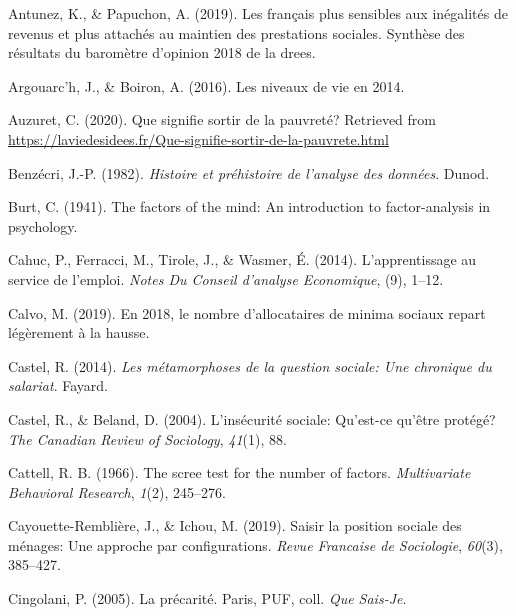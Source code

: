 \documentclass[12pt,a4paper]{reedthesis}
\newenvironment{CSLReferences}%
  {}%
  {\par}
\begin{document}
\hypertarget{refs}{}
\begin{CSLReferences}{1}{0}
\leavevmode\hypertarget{ref-antunez2019franccais}{}%
Antunez, K., \& Papuchon, A. (2019). Les fran{ç}ais plus sensibles aux in{é}galit{é}s de revenus et plus attach{é}s au maintien des prestations sociales. Synth{è}se des r{é}sultats du barom{è}tre d'opinion 2018 de la drees.

\leavevmode\hypertarget{ref-argouarc2016niveaux}{}%
Argouarc'h, J., \& Boiron, A. (2016). Les niveaux de vie en 2014.

\leavevmode\hypertarget{ref-auzuret2020signifie}{}%
Auzuret, C. (2020). Que signifie sortir de la pauvret{é}? Retrieved from \url{https://laviedesidees.fr/Que-signifie-sortir-de-la-pauvrete.html}

\leavevmode\hypertarget{ref-benzecri1982histoire}{}%
Benzécri, J.-P. (1982). \emph{Histoire et pr{é}histoire de l'analyse des donn{é}es}. Dunod.

\leavevmode\hypertarget{ref-burt1941factors}{}%
Burt, C. (1941). The factors of the mind: An introduction to factor-analysis in psychology.

\leavevmode\hypertarget{ref-cahuc2014apprentissage}{}%
Cahuc, P., Ferracci, M., Tirole, J., \& Wasmer, É. (2014). L'apprentissage au service de l'emploi. \emph{Notes Du Conseil d'analyse Economique}, (9), 1--12.

\leavevmode\hypertarget{ref-calvo20192018}{}%
Calvo, M. (2019). En 2018, le nombre d'allocataires de minima sociaux repart l{é}g{è}rement {à} la hausse.

\leavevmode\hypertarget{ref-castel2014metamorphoses}{}%
Castel, R. (2014). \emph{Les m{é}tamorphoses de la question sociale: Une chronique du salariat}. Fayard.

\leavevmode\hypertarget{ref-castel2004insecurite}{}%
Castel, R., \& Beland, D. (2004). L'ins{é}curit{é} sociale: Qu'est-ce qu'{ê}tre prot{é}g{é}? \emph{The Canadian Review of Sociology}, \emph{41}(1), 88.

\leavevmode\hypertarget{ref-cattell1966scree}{}%
Cattell, R. B. (1966). The scree test for the number of factors. \emph{Multivariate Behavioral Research}, \emph{1}(2), 245--276.

\leavevmode\hypertarget{ref-cayouette2019saisir}{}%
Cayouette-Remblière, J., \& Ichou, M. (2019). Saisir la position sociale des m{é}nages: Une approche par configurations. \emph{Revue Francaise de Sociologie}, \emph{60}(3), 385--427.

\leavevmode\hypertarget{ref-cingolani2005precarite}{}%
Cingolani, P. (2005). La pr{é}carit{é}. Paris, PUF, coll.{{}} \emph{Que Sais-Je}.


\end{CSLReferences}
\end{document}
